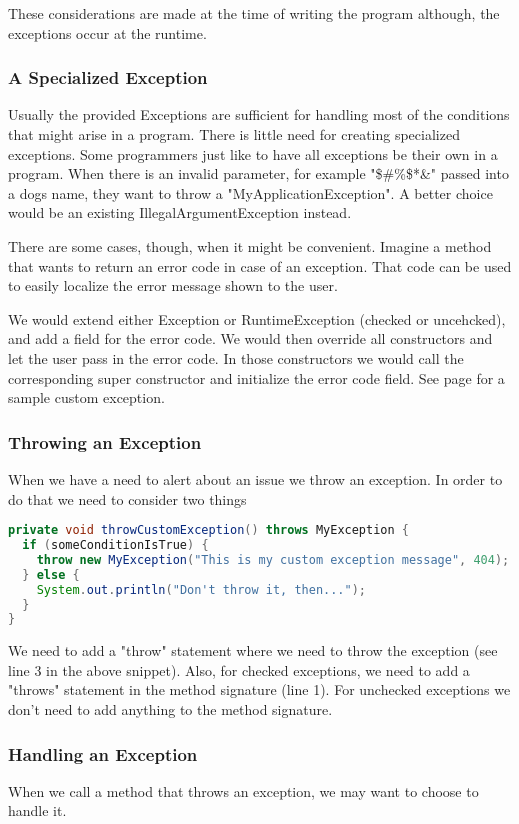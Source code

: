 These considerations are made at the time of writing the program although, the exceptions occur at the runtime.

\subsubsection{A Specialized Exception}
Usually the provided Exceptions are sufficient for handling most of the conditions that might arise in a program. There is little need for creating specialized exceptions. Some programmers just like to have all exceptions be their own in a program. When there is an invalid parameter, for example "\@\$\#\%\$*\&" passed into a dogs name, they want to  throw a "MyApplicationException". A better choice would be an existing  IllegalArgumentException instead.

There are some cases, though, when it might be convenient. Imagine a method that wants to return an error code in case of an exception. That code can be used to easily localize the error message shown to the user. 

We would extend either Exception or RuntimeException (checked or uncehcked), and add a field for the error code. We would then override all constructors and let the user pass in the error code. In those constructors we would call the corresponding super constructor and  initialize the error code field. See page \pageref{App:AppendixH} for a sample custom exception.


\subsubsection{Throwing an Exception}
When we have a need to alert about an issue we throw an exception. In order to do that we need to consider two things
\begin{lstlisting}[language=Java]
private void throwCustomException() throws MyException {
  if (someConditionIsTrue) {
    throw new MyException("This is my custom exception message", 404);
  } else {
    System.out.println("Don't throw it, then...");
  }
}
\end{lstlisting}

We need to add a "throw" statement where we need to throw the exception (see line 3 in the above snippet). Also, for checked exceptions, we need to add a "throws" statement in the method signature (line 1). For unchecked exceptions we don't need to add anything to the method signature.

\subsubsection{Handling an Exception}
When we call a method that throws an exception, we may want to choose to handle it. 

